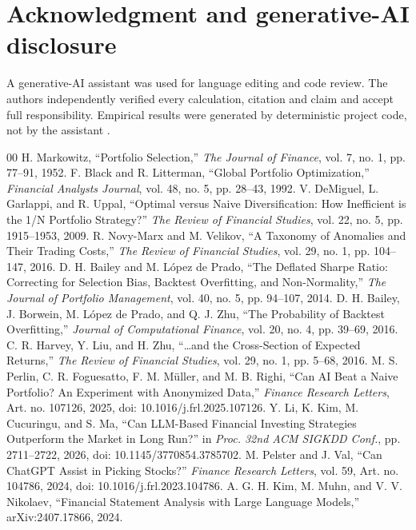 \documentclass[10pt,conference]{IEEEtran}
\begin{document}
\section*{Acknowledgment and generative-AI disclosure}
A generative-AI assistant was used for language editing and code review. The authors independently verified every calculation, citation and claim and accept full responsibility. Empirical results were generated by deterministic project code, not by the assistant \cite{openai}.

\clearpage
\begin{thebibliography}{00}
 H. Markowitz, ``Portfolio Selection,'' \emph{The Journal of Finance}, vol. 7, no. 1, pp. 77--91, 1952.
 F. Black and R. Litterman, ``Global Portfolio Optimization,'' \emph{Financial Analysts Journal}, vol. 48, no. 5, pp. 28--43, 1992.
 V. DeMiguel, L. Garlappi, and R. Uppal, ``Optimal versus Naive Diversification: How Inefficient is the 1/N Portfolio Strategy?'' \emph{The Review of Financial Studies}, vol. 22, no. 5, pp. 1915--1953, 2009.
 R. Novy-Marx and M. Velikov, ``A Taxonomy of Anomalies and Their Trading Costs,'' \emph{The Review of Financial Studies}, vol. 29, no. 1, pp. 104--147, 2016.
 D. H. Bailey and M. L\'opez de Prado, ``The Deflated Sharpe Ratio: Correcting for Selection Bias, Backtest Overfitting, and Non-Normality,'' \emph{The Journal of Portfolio Management}, vol. 40, no. 5, pp. 94--107, 2014.
 D. H. Bailey, J. Borwein, M. L\'opez de Prado, and Q. J. Zhu, ``The Probability of Backtest Overfitting,'' \emph{Journal of Computational Finance}, vol. 20, no. 4, pp. 39--69, 2016.
 C. R. Harvey, Y. Liu, and H. Zhu, ``\ldots and the Cross-Section of Expected Returns,'' \emph{The Review of Financial Studies}, vol. 29, no. 1, pp. 5--68, 2016.
 M. S. Perlin, C. R. Foguesatto, F. M. M\"uller, and M. B. Righi, ``Can AI Beat a Naive Portfolio? An Experiment with Anonymized Data,'' \emph{Finance Research Letters}, Art. no. 107126, 2025, doi: 10.1016/j.frl.2025.107126.
 Y. Li, K. Kim, M. Cucuringu, and S. Ma, ``Can LLM-Based Financial Investing Strategies Outperform the Market in Long Run?'' in \emph{Proc. 32nd ACM SIGKDD Conf.}, pp. 2711--2722, 2026, doi: 10.1145/3770854.3785702.
 M. Pelster and J. Val, ``Can ChatGPT Assist in Picking Stocks?'' \emph{Finance Research Letters}, vol. 59, Art. no. 104786, 2024, doi: 10.1016/j.frl.2023.104786.
 A. G. H. Kim, M. Muhn, and V. V. Nikolaev, ``Financial Statement Analysis with Large Language Models,'' arXiv:2407.17866, 2024.

\end{thebibliography}
\end{document}
